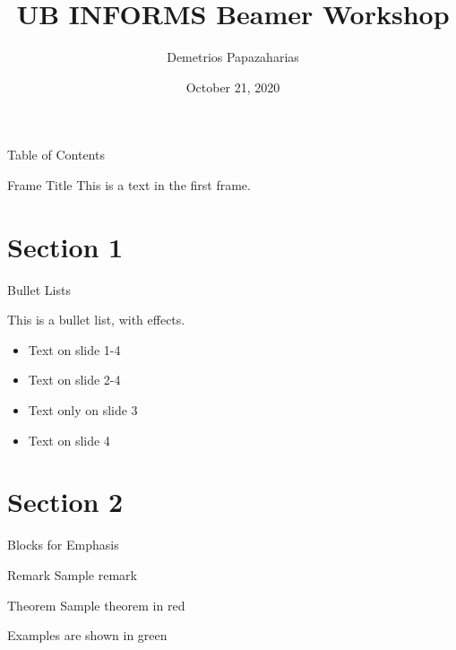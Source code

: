 \documentclass{beamer}
\title[Beamer Workshop]{UB INFORMS Beamer Workshop}
\author[Papazaharias, D.]{Demetrios Papazaharias\inst{1}}
\institute[UB]{\inst{1}University at Buffalo}
\date{October 21, 2020}
\begin{document}
\begin{frame}
    \maketitle
\end{frame}

\begin{frame}{Table of Contents}
    \tableofcontents
\end{frame}


\begin{frame}{Frame Title}
This is a text in the first frame.
\end{frame}

\section{Section 1}

\begin{frame}{Bullet Lists}

    This is a bullet list, with effects.
    \begin{itemize}\setlength\itemsep{1em}
        \item<1-> Text on slide 1-4
        \item<2-> Text on slide 2-4
        \item<3> Text only on slide 3
        \item<4-> Text on slide 4
    \end{itemize}
    
\end{frame}

\section{Section 2}

\begin{frame}{Blocks for Emphasis}
    \begin{block}{Remark}
        Sample remark
    \end{block}

    \begin{alertblock}{Theorem}        
        Sample theorem in red
    \end{alertblock}
    
    \begin{example}
        Examples are shown in green
    \end{example}
\end{frame}
\end{document}
